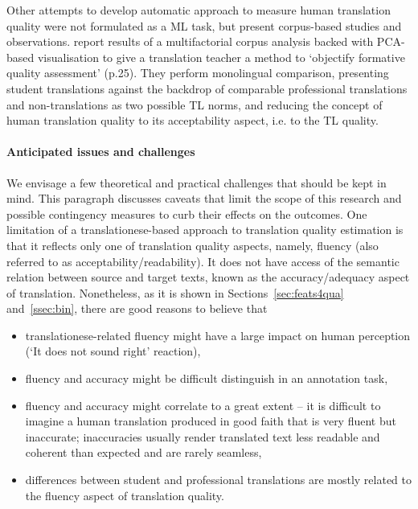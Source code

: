 Other attempts to develop automatic approach to measure human translation quality were not formulated as a ML task, but present corpus-based studies and observations. \citet{Sutter2017} report results of a multifactorial corpus analysis backed with \gls{PCA}-based visualisation to give a translation teacher a method to `objectify formative quality assessment' (p.25). They perform monolingual comparison, presenting student translations against the backdrop of comparable professional translations and non-translations as two possible TL norms, and reducing the concept of human translation quality to its acceptability aspect, i.e. to the TL quality. 

\paragraph{Anticipated issues and challenges} We envisage a few theoretical and practical challenges that should be kept in mind. This paragraph discusses caveats that limit the scope of this research and possible contingency measures to curb their effects on the outcomes. 
One limitation of a translationese-based approach to translation quality estimation is that it reflects only one of translation quality aspects, namely, fluency (also referred to as acceptability/readability). It does not have access of the semantic relation between source and target texts, known as the accuracy/adequacy aspect of translation. Nonetheless, as it is shown in Sections~\ref{sec:feats4qua} and~\ref{ssec:bin}, there are good reasons to believe that 
\begin{itemize}\compresslist{}
	\item translationese-related fluency might have a large impact on human perception (`It does not sound right' reaction),
	\item fluency and accuracy might be difficult distinguish in an annotation task, 
	\item fluency and accuracy might correlate to a great extent -- it is difficult to imagine a human translation produced in good faith that is very fluent but inaccurate; inaccuracies usually render translated text less readable and coherent than expected and are rarely seamless,
	\item differences between student and professional translations are mostly related to the fluency aspect of translation quality.
\end{itemize}

